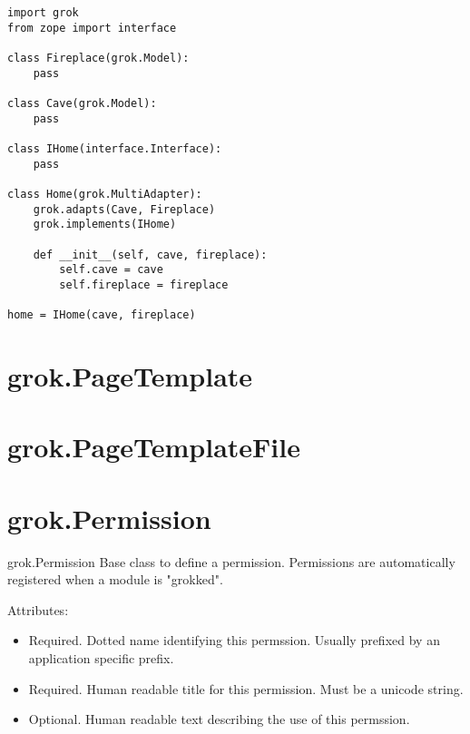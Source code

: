   \begin{verbatim}
import grok
from zope import interface

class Fireplace(grok.Model):
    pass

class Cave(grok.Model):
    pass

class IHome(interface.Interface):
    pass

class Home(grok.MultiAdapter):
    grok.adapts(Cave, Fireplace)
    grok.implements(IHome)

    def __init__(self, cave, fireplace):
        self.cave = cave
        self.fireplace = fireplace

home = IHome(cave, fireplace)
  \end{verbatim}

\section{grok.PageTemplate}

\section{grok.PageTemplateFile}

\section{grok.Permission}

  \begin{classdesc*}{grok.Permission}
    Base class to define a permission. Permissions are automatically
    registered when a module is "grokked".

  \begin{bf}Attributes:\end{bf}

  \begin{itemize}
    \item[\function{id(dotted_name)}] Required. Dotted name identifying this
      permssion. Usually prefixed by an application specific prefix.

    \item[\function{title(name)}] Required. Human readable title for this
      permission. Must be a unicode string.

    \item[\function{description(text)}] Optional. Human readable text
      describing the use of this permssion.
  \end{itemize}
  \end{classdesc*}

